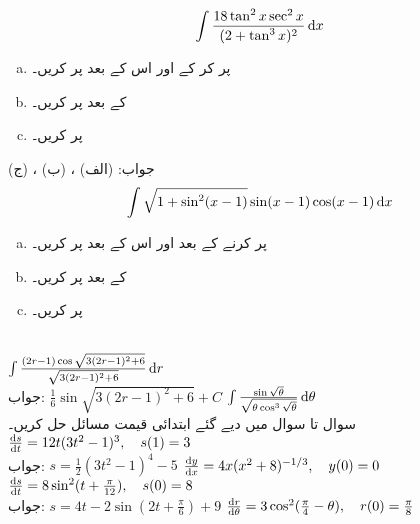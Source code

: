 \begin{align*}
\int\frac{18\tan^2x\sec^2x}{(2+\tan^3x)^2}\dif x
\end{align*}
\begin{enumerate}[a.]
\item
{} پر کر کے   اور اس کے بعد  پر کریں۔
\item
{} کے بعد  پر کریں۔
\item
{} پر کریں۔
\end{enumerate}
جواب:\quad
(الف) ، (ب) ، (ج) 
\begin{align*}
\int\sqrt{1+\sin^2(x-1)}\sin(x-1)\cos(x-1)\dif x
\end{align*}
\begin{enumerate}[a.]
\item
{} پر کرنے کے بعد  اور اس کے بعد  پر کریں۔
\item
{} کے بعد  پر کریں۔
\item
{} پر کریں۔
\end{enumerate}
\\
$\int\tfrac{(2r-1)\cos\sqrt{3(2r-1)^2+6}}{\sqrt{3(2r-1)^2+6}}\dif r$\\
جواب:\quad
$\tfrac{1}{6}\sin\sqrt{3(2r-1)^2+6}+C$
$\int\tfrac{\sin\sqrt{\theta}}{\sqrt{\theta\cos^3\sqrt{\theta}}}\dif\theta$
\\
سوال  تا سوال  میں دیے گئے ابتدائی قیمت مسائل حل کریں۔\\
$\tfrac{\dif s}{\dif t}=12t(3t^2-1)^3,\quad s(1)=3$\\
جواب:\quad
$s=\tfrac{1}{2}(3t^2-1)^4-5$
$\tfrac{\dif y}{\dif x}=4x(x^2+8)^{-1/3},\quad y(0)=0$
$\tfrac{\dif s}{\dif t}=8\sin^2(t+\tfrac{\pi}{12}),\quad s(0)=8$\\
جواب:\quad
$s=4t-2\sin(2t+\tfrac{\pi}{6})+9$
$\tfrac{\dif r}{\dif \theta}=3\cos^2(\tfrac{\pi}{4}-\theta),\quad r(0)=\tfrac{\pi}{8}$
